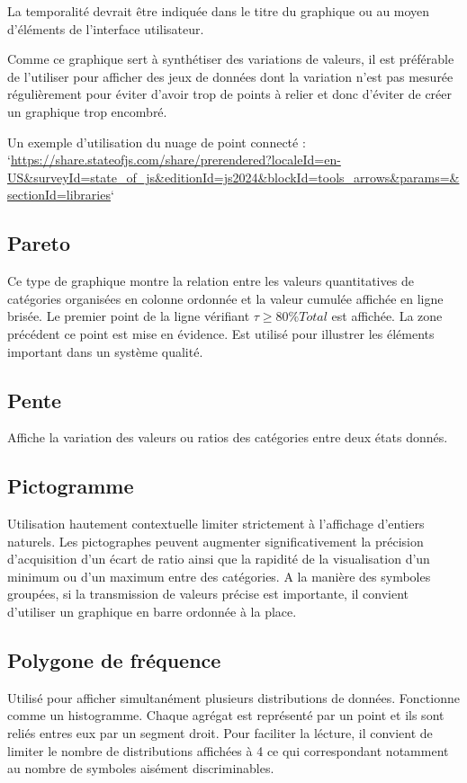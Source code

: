 \documentclass[a4paper,12pt]{article}
\begin{document}
\begin{multicols}{2}
La temporalité devrait être indiquée dans le titre du graphique ou au moyen d'éléments de l'interface utilisateur.

Comme ce graphique sert à synthétiser des variations de valeurs, il est préférable de l'utiliser pour afficher des jeux de données dont la variation n'est pas mesurée régulièrement pour éviter d'avoir trop de points à relier et donc d'éviter de créer un graphique trop encombré. \autocite{jonathanschwabishComparingCategories2021}

Un exemple d'utilisation du nuage de point connecté : `\url{https://share.stateofjs.com/share/prerendered?localeId=en-US\&surveyId=state\_of\_js\&editionId=js2024\&blockId=tools\_arrows\&params=\&sectionId=libraries}`
\subsection*{Pareto}
\label{sec:org991c209}
Ce type de graphique montre la relation entre les valeurs quantitatives de catégories organisées en colonne ordonnée et la valeur cumulée affichée en ligne brisée. Le premier point de la ligne vérifiant \(\tau\geq80\%Total\) est affichée. La zone précédent ce point est mise en évidence.
Est utilisé pour illustrer les éléments important dans un système qualité.
\subsection*{Pente}
\label{sec:org31b46e5}
Affiche la variation des valeurs ou ratios des catégories entre deux états donnés. \autocite{alansmithLexiqueVisuel}
\subsection*{Pictogramme}
\label{sec:org7d7aebf}
Utilisation hautement contextuelle limiter strictement à l'affichage d'entiers naturels. \autocite{alansmithLexiqueVisuel}
Les pictographes peuvent augmenter significativement la précision d'acquisition d'un écart de ratio ainsi que la rapidité de la visualisation d'un minimum ou d'un maximum entre des catégories. \autocite{tranDiscoveringAccessibleData2024} A la manière des symboles groupées, si la transmission de valeurs précise est importante, il convient d'utiliser un graphique en barre ordonnée à la place. \autocite{tranDiscoveringAccessibleData2024}
\subsection*{Polygone de fréquence}
\label{sec:orgb74df14}
Utilisé pour afficher simultanément plusieurs distributions de données. Fonctionne comme un histogramme. Chaque agrégat est représenté par un point et ils sont reliés entres eux par un segment droit. Pour faciliter la lécture, il convient de limiter le nombre de distributions affichées à 4 \autocite{alansmithLexiqueVisuel} ce qui correspondant notamment au nombre de symboles aisément discriminables.

\end{multicols}
\end{document}

